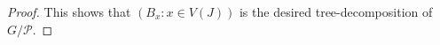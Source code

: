 \documentclass{patmorin}
\newcommand{\PP}{\mathcal{P}}
\begin{document}
\begin{proof}

This shows that $(B_x:x\in V(J))$ is the desired tree-decomposition of $G/\PP$.
\end{proof}
\end{document}
